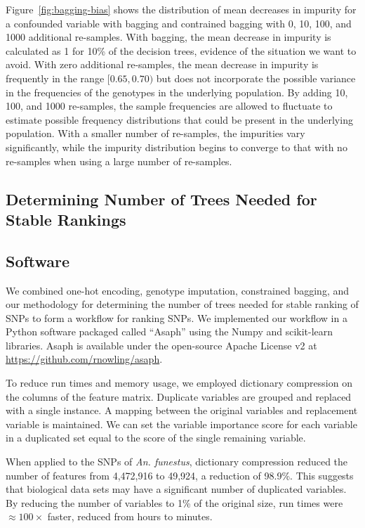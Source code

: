 Figure~\ref{fig:bagging-bias} shows the distribution of mean decreases in impurity for a confounded variable with bagging and contrained bagging with 0, 10, 100, and 1000 additional re-samples.  With bagging, the mean decrease in impurity is calculated as 1 for 10\% of the decision trees, evidence of the situation we want to avoid.  With zero additional re-samples, the mean decrease in impurity is frequently in the range $[0.65, 0.70)$ but does not incorporate the possible variance in the frequencies of the genotypes in the underlying population.  By adding 10, 100, and 1000 re-samples, the sample frequencies are allowed to fluctuate to estimate possible frequency distributions that could be present in the underlying population.  With a smaller number of re-samples, the impurities vary significantly, while the impurity distribution begins to converge to that with no re-samples when using a large number of re-samples.

\subsection{Determining Number of Trees Needed for Stable Rankings}

\subsection{Software}
We combined one-hot encoding, genotype imputation, constrained bagging, and our methodology for determining the number of trees needed for stable ranking of SNPs to form a workflow for ranking SNPs.  We implemented our workflow in a Python software packaged called ``Asaph'' using the Numpy and scikit-learn libraries.  Asaph is available under the open-source Apache License v2 at \url{https://github.com/rnowling/asaph}.

To reduce run times and memory usage, we employed dictionary compression on the columns of the feature matrix. Duplicate variables are grouped and replaced with a single instance.  A mapping between the original variables and replacement variable is maintained.  We can set the variable importance score for each variable in a duplicated set equal to the score of the single remaining variable.

When applied to the SNPs of \emph{An. funestus}, dictionary compression reduced the number of features from 4,472,916 to 49,924, a reduction of 98.9\%.   This suggests that biological data sets may have a significant number of duplicated variables.  By reducing the number of variables to 1\% of the original size, run times were $\approx100 \times$ faster, reduced from hours to minutes.


